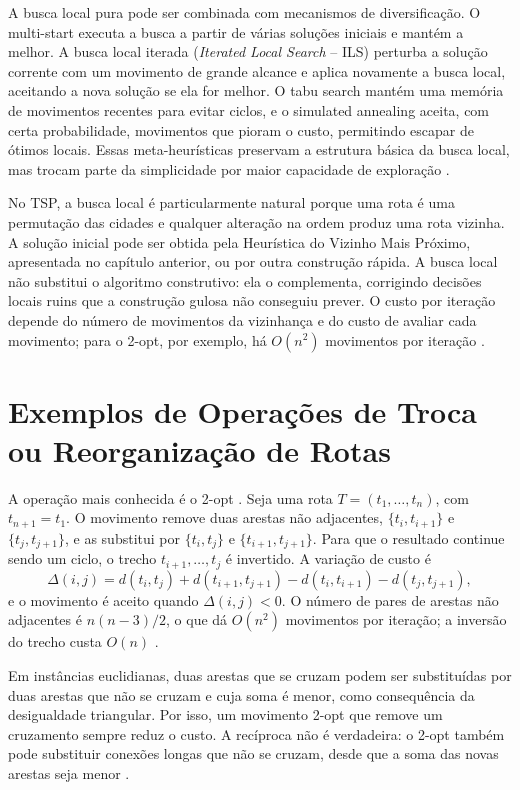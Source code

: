 A busca local pura pode ser combinada com mecanismos de diversificação. O multi-start executa a busca a partir de várias soluções iniciais e mantém a melhor. A busca local iterada (\textit{Iterated Local Search} -- ILS) perturba a solução corrente com um movimento de grande alcance e aplica novamente a busca local, aceitando a nova solução se ela for melhor. O tabu search mantém uma memória de movimentos recentes para evitar ciclos, e o simulated annealing aceita, com certa probabilidade, movimentos que pioram o custo, permitindo escapar de ótimos locais. Essas meta-heurísticas preservam a estrutura básica da busca local, mas trocam parte da simplicidade por maior capacidade de exploração \cite{souza_ufop, goldbarg2005, aarts2003}.

No TSP, a busca local é particularmente natural porque uma rota é uma permutação das cidades e qualquer alteração na ordem produz uma rota vizinha. A solução inicial pode ser obtida pela Heurística do Vizinho Mais Próximo, apresentada no capítulo anterior, ou por outra construção rápida. A busca local não substitui o algoritmo construtivo: ela o complementa, corrigindo decisões locais ruins que a construção gulosa não conseguiu prever. O custo por iteração depende do número de movimentos da vizinhança e do custo de avaliar cada movimento; para o 2-opt, por exemplo, há $O(n^2)$ movimentos por iteração \cite{croes1958, johnson1997}.

\section{Exemplos de Operações de Troca ou Reorganização de Rotas}

A operação mais conhecida é o 2-opt \cite{croes1958}. Seja uma rota $T = (t_1, \dots, t_n)$, com $t_{n+1} = t_1$. O movimento remove duas arestas não adjacentes, $\{t_i, t_{i+1}\}$ e $\{t_j, t_{j+1}\}$, e as substitui por $\{t_i, t_j\}$ e $\{t_{i+1}, t_{j+1}\}$. Para que o resultado continue sendo um ciclo, o trecho $t_{i+1}, \dots, t_j$ é invertido. A variação de custo é
\begin{equation}
    \Delta(i,j) = d(t_i,t_j) + d(t_{i+1},t_{j+1}) - d(t_i,t_{i+1}) - d(t_j,t_{j+1}),
    \label{eq:delta-2opt}
\end{equation}
e o movimento é aceito quando $\Delta(i,j) < 0$. O número de pares de arestas não adjacentes é $n(n-3)/2$, o que dá $O(n^2)$ movimentos por iteração; a inversão do trecho custa $O(n)$ \cite{croes1958, johnson1997}.

Em instâncias euclidianas, duas arestas que se cruzam podem ser substituídas por duas arestas que não se cruzam e cuja soma é menor, como consequência da desigualdade triangular. Por isso, um movimento 2-opt que remove um cruzamento sempre reduz o custo. A recíproca não é verdadeira: o 2-opt também pode substituir conexões longas que não se cruzam, desde que a soma das novas arestas seja menor \cite{feofiloff_caixeiro}.

